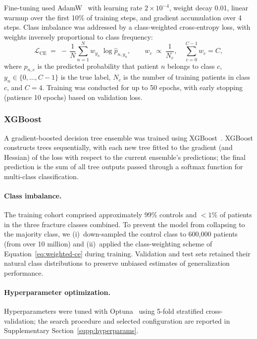 \documentclass[12pt]{article}
\begin{document}
Fine-tuning used AdamW~\citep{Loshchilov2019AdamW} with learning rate $2\times 10^{-4}$, weight decay 0.01, linear warmup over the first 10\% of training steps, and gradient accumulation over 4 steps. Class imbalance was addressed by a class-weighted cross-entropy loss, with weights inversely proportional to class frequency:
\begin{equation}
\mathcal{L}_{\mathrm{CE}} \;=\; -\,\frac{1}{N}\sum_{n=1}^{N} w_{y_n}\, \log \hat{p}_{n,y_n},
\qquad
w_c \;\propto\; \frac{1}{N_c},\quad \sum_{c=0}^{C-1} w_c = C,
\label{eq:weighted-ce}
\end{equation}
where $\hat{p}_{n,c}$ is the predicted probability that patient $n$ belongs to class $c$, $y_n \in \{0,\dots,C{-}1\}$ is the true label, $N_c$ is the number of training patients in class $c$, and $C = 4$. Training was conducted for up to 50 epochs, with early stopping (patience 10 epochs) based on validation loss.

\subsubsection{XGBoost}

A gradient-boosted decision tree ensemble was trained using XGBoost~\citep{Chen2016XGBoost}. XGBoost constructs trees sequentially, with each new tree fitted to the gradient (and Hessian) of the loss with respect to the current ensemble's predictions; the final prediction is the sum of all tree outputs passed through a softmax function for multi-class classification.

\paragraph{Class imbalance.}
The training cohort comprised approximately 99\% controls and $<\!1\%$ of patients in the three fracture classes combined. To prevent the model from collapsing to the majority class, we (i)~down-sampled the control class to 600{,}000 patients (from over 10 million) and (ii)~applied the class-weighting scheme of Equation~\eqref{eq:weighted-ce} during training. Validation and test sets retained their natural class distributions to preserve unbiased estimates of generalization performance.

\paragraph{Hyperparameter optimization.}
Hyperparameters were tuned with Optuna~\citep{Akiba2019Optuna} using 5-fold stratified cross-validation; the search procedure and selected configuration are reported in Supplementary Section~\ref{supp:hyperparams}.
\end{document}

